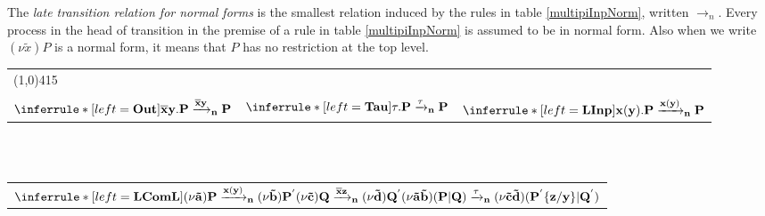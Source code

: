 \begin{definition}
  The \emph{late transition relation for normal forms} is the smallest relation induced by the rules in table \ref{multipiInpNorm}, written $\rightarrow_{n}$. Every process in the head of transition in the premise of a rule in table \ref{multipiInpNorm} is assumed to be in normal form. Also when we write $(\nu \tilde{x})P$ is a normal form, it means that $P$ has no restriction at the top level.
  \begin{table}
    \begin{tabular}{lll}
	\multicolumn{3}{l}{\line(1,0){415}}
	\\\\
	  $\inferrule* [left=\bf{Out}]{
	  }{
	    \overline{x}y.P \xrightarrow{\overline{x}y}_{n} P
	  }$
	&
	  $\inferrule* [left=\bf{Tau}]{
	  }{
	    \tau.P \xrightarrow{\tau}_{n} P
	  }$
	&
	  $\inferrule* [left=\bf{LInp}]{
	  }{
	    x(y).P \xrightarrow{x(y)}_{n} P
	  }$
      \\
      \end{tabular}
	\\\\
      \begin{tabular}{l}
      \\
	  $\inferrule* [left=\bf{LComL}]{
	      (\nu \tilde{a}) P \xrightarrow{x(y)}_{n} (\nu \tilde{b})P^{'}
	    \\
	      (\nu \tilde{c}) Q\xrightarrow{\overline{x}z}_{n} (\nu \tilde{d})Q^{'}
	  }{
	    (\nu \tilde{a} \tilde{b})(P|Q) \xrightarrow{\tau}_{n} (\nu \tilde{c} \tilde{d})(P^{'}\{z/y\}|Q^{'})
	  }$

\end{tabular}
\end{table}
\end{definition}
